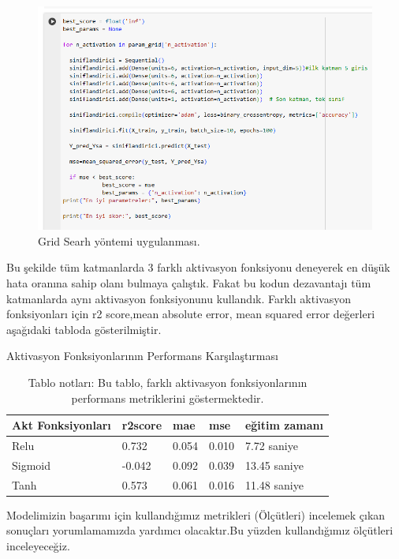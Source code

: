 \documentclass[12pt, a4paper]{article}
\begin{document}
	\begin{figure}[!h]
		\centering
		\includegraphics{6.8.png}
		\caption{Grid Searh yöntemi uygulanması.}
	\end{figure}
	\newpage
	Bu şekilde tüm katmanlarda 3 farklı aktivasyon fonksiyonu deneyerek en düşük hata oranına sahip olanı bulmaya çalıştık. Fakat bu kodun dezavantajı tüm katmanlarda aynı aktivasyon fonksiyonunu kullandık.
	Farklı aktivasyon fonksiyonları için r2 score,mean absolute error, mean squared error değerleri aşağıdaki tabloda gösterilmiştir.
	
	\begin{table}[h!]
		\centering
		\caption{Aktivasyon Fonksiyonlarının Performans Karşılaştırması}
		\label{tab:performance_comparison}
		\begin{tabular}{lllll}
			\hline
			Akt Fonksiyonları  & r2score & mae & mse & eğitim zamanı \\ \hline
			Relu & 0.732 & 0.054 & 0.010 & 7.72 saniye\\
			Sigmoid & -0.042 & 0.092 & 0.039 & 13.45 saniye \\
			Tanh & 0.573 & 0.061 & 0.016 & 11.48 saniye\\ 
			\hline
		\end{tabular}
		\caption*{Tablo notları: Bu tablo, farklı aktivasyon fonksiyonlarının performans metriklerini göstermektedir.}
	\end{table}
	\newpage
	Modelimizin başarımı için kullandığımız metrikleri (Ölçütleri) incelemek çıkan sonuçları yorumlamamızda yardımcı olacaktır.Bu yüzden kullandığımız ölçütleri inceleyeceğiz.
	
\end{document}
